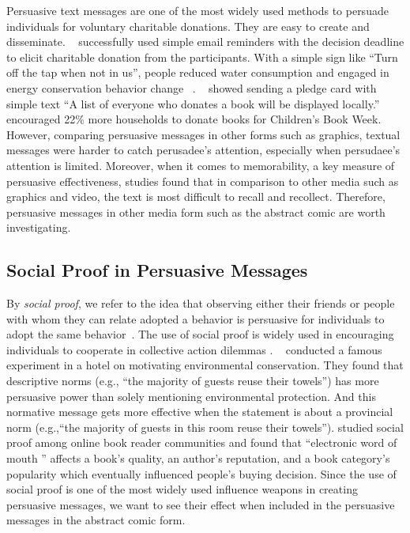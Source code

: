 Persuasive text messages are one of the most widely used methods to persuade individuals for voluntary charitable donations. They are easy to create and disseminate. ~\textcite{damgaard2017now} successfully used simple email reminders with the decision deadline to elicit charitable donation from the participants. With a simple sign like ``Turn off the tap when not in us'', people reduced water consumption and engaged in energy conservation behavior change ~\cite{mckenzie2011fostering}. ~\textcite{cotterill2010impact} showed sending a pledge card with simple text ``A list of everyone who donates a book will be displayed locally.'' encouraged 22\% more households to donate books for Children's Book Week. However, comparing persuasive messages in other forms such as graphics, textual messages were harder to catch perusadee's attention, especially when persudaee's attention is limited. Moreover, when it comes to memorability, a key measure of persuasive effectiveness, studies found that in comparison to other media such as graphics and video, the text is most difficult to recall and recollect. Therefore, persuasive messages in other media form such as the abstract comic are worth investigating. 


\subsection{Social Proof in Persuasive Messages }
By \textit{social proof}, we refer to the idea that observing either their friends or people with whom they can relate adopted a behavior is persuasive for individuals to adopt the same behavior~\cite{Cialdini1993, Cialdini2004}. The use of social proof is widely used in encouraging individuals to cooperate in collective action dilemmas \cite{goldstein2008room,schultz2007constructive}. ~\textcite{goldstein2008room} conducted a famous experiment in a hotel on motivating environmental conservation. They found that descriptive norms (e.g., ``the majority of guests reuse their towels'') has more persuasive power than solely mentioning environmental protection. And this normative message gets more effective when the statement is about a provincial norm (e.g.,``the majority of guests in this room reuse their towels''). \textcite{amblee2011harnessing} studied social proof among online book reader communities and found that 
``electronic word of mouth '' affects a book's quality, an author's reputation, and a book category's popularity which eventually influenced people's buying decision. Since the use of social proof is one of the most widely used influence weapons in creating persuasive messages, we want to see their effect when included in the persuasive messages in the abstract comic form. 


